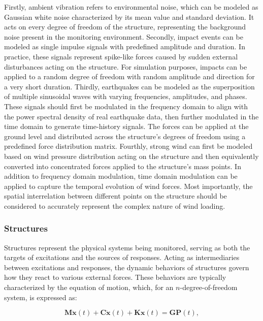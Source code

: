\documentclass[a4paper,fleqn,numbers,sort&compress]{cas-sc}
\begin{document}
Firstly, ambient vibration refers to environmental noise, which can be modeled as Gaussian white noise characterized by its mean value and standard deviation. It acts on every degree of freedom of the structure, representing the background noise present in the monitoring environment. Secondly, impact events can be modeled as single impulse signals with predefined amplitude and duration. In practice, these signals represent spike-like forces caused by sudden external disturbances acting on the structure. For simulation purposes, impacts can be applied to a random degree of freedom with random amplitude and direction for a very short duration. Thirdly, earthquakes can be modeled as the superposition of multiple sinusoidal waves with varying frequencies, amplitudes, and phases. These signals should first be modulated in the frequency domain to align with the power spectral density of real earthquake data, then further modulated in the time domain to generate time-history signals. The forces can be applied at the ground level and distributed across the structure’s degrees of freedom using a predefined force distribution matrix. Fourthly, strong wind can first be modeled based on wind pressure distribution acting on the structure and then equivalently converted into concentrated forces applied to the structure’s mass points. In addition to frequency domain modulation, time domain modulation can be applied to capture the temporal evolution of wind forces. Most importantly, the spatial interrelation between different points on the structure should be considered to accurately represent the complex nature of wind loading.

\subsubsection{Structures}
\label{environment-structures}

Structures represent the physical systems being monitored, serving as both the targets of excitations and the sources of responses. Acting as intermediaries between excitations and responses, the dynamic behaviors of structures govern how they react to various external forces. These behaviors are typically characterized by the equation of motion, which, for an $n$-degree-of-freedom system, is expressed as:

\begin{equation}
    \mathbf{M} \ddot{\mathbf{x}}(t) + \mathbf{C} \dot{\mathbf{x}}(t) + \mathbf{K} \mathbf{x}(t) = \mathbf{G} \mathbf{P}(t),
\end{equation}
\end{document}
